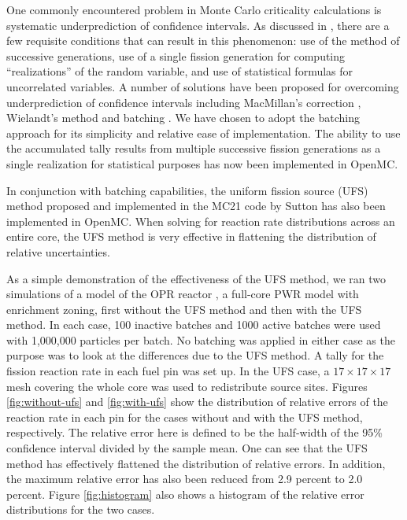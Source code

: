 \documentclass{ansconf}
\begin{document}
One commonly encountered problem in Monte Carlo criticality calculations is
systematic underprediction of confidence intervals. As discussed in
\cite{physor-kelly-2012}, there are a few requisite conditions that can result
in this phenomenon: use of the method of successive generations, use of a single
fission generation for computing ``realizations'' of the random variable, and
use of statistical formulas for uncorrelated variables. A number of solutions
have been proposed for overcoming underprediction of confidence intervals
including MacMillan's correction \cite{nse-macmillan-1973}, Wielandt's method
\cite{trans-kiedrowski-2008} and batching \cite{physor-kelly-2012}. We have
chosen to adopt the batching approach for its simplicity and relative ease of
implementation. The ability to use the accumulated tally results from multiple
successive fission generations as a single realization for statistical purposes
has now been implemented in OpenMC.

In conjunction with batching capabilities, the uniform fission source (UFS)
method proposed and implemented in the MC21 code by Sutton
\cite{physor-kelly-2012} has also been implemented in OpenMC. When solving for
reaction rate distributions across an entire core, the UFS method is very
effective in flattening the distribution of relative uncertainties.

As a simple demonstration of the effectiveness of the UFS method, we ran two
simulations of a model of the OPR reactor \cite{physor-lee-2012}, a full-core
PWR model with enrichment zoning, first without the UFS method and then with the
UFS method. In each case, 100 inactive batches and 1000 active batches were used
with 1,000,000 particles per batch. No batching was applied in either case as
the purpose was to look at the differences due to the UFS method. A tally for
the fission reaction rate in each fuel pin was set up. In the UFS case, a $17
\times 17 \times 17$ mesh covering the whole core was used to redistribute
source sites. Figures \ref{fig:without-ufs} and \ref{fig:with-ufs} show the
distribution of relative errors of the reaction rate in each pin for the cases
without and with the UFS method, respectively. The relative error here is
defined to be the half-width of the 95\% confidence interval divided by the
sample mean. One can see that the UFS method has effectively flattened the
distribution of relative errors. In addition, the maximum relative error has
also been reduced from 2.9 percent to 2.0 percent. Figure \ref{fig:histogram}
also shows a histogram of the relative error distributions for the two cases.
\end{document}
